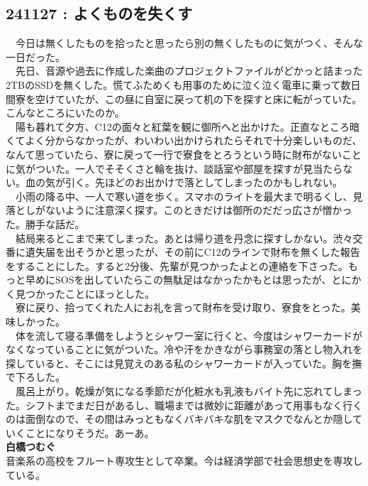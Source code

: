 \begin{myboxnote}
\subsection{241127 : よくものを失くす}
\noindent
　今日は無くしたものを拾ったと思ったら別の無くしたものに気がつく、そんな一日だった。\\
　先日、音源や過去に作成した楽曲のプロジェクトファイルがどかっと詰まった2TBのSSDを無くした。慌てふためくも用事のために泣く泣く電車に乗って数日間寮を空けていたが、この昼に自室に戻って机の下を探すと床に転がっていた。こんなところにいたのか。\\
　陽も暮れて夕方、C12の面々と紅葉を観に御所へと出かけた。正直なところ暗くてよく分からなかったが、わいわい出かけられたらそれで十分楽しいものだ、なんて思っていたら、寮に戻って一行で寮食をとろうという時に財布がないことに気がついた。一人でそそくさと輪を抜け、談話室や部屋を探すが見当たらない。血の気が引く。先ほどのお出かけで落としてしまったのかもしれない。\\
　小雨の降る中、一人で寒い道を歩く。スマホのライトを最大まで明るくし、見落としがないように注意深く探す。このときだけは御所のだだっ広さが憎かった。勝手な話だ。\\
　結局来るとこまで来てしまった。あとは帰り道を丹念に探すしかない。渋々交番に遺失届を出そうかと思ったが、その前にC12のラインで財布を無くした報告をすることにした。すると2分後、先輩が見つかったよとの連絡を下さった。もっと早めにSOSを出していたらこの無駄足はなかったかもとは思ったが、とにかく見つかったことにほっとした。\\
　寮に戻り、拾ってくれた人にお礼を言って財布を受け取り、寮食をとった。美味しかった。\\
　体を流して寝る準備をしようとシャワー室に行くと、今度はシャワーカードがなくなっていることに気がついた。冷や汗をかきながら事務室の落とし物入れを探していると、そこには見覚えのある私のシャワーカードが入っていた。胸を撫で下ろした。\\
　風呂上がり。乾燥が気になる季節だが化粧水も乳液もバイト先に忘れてしまった。シフトまでまだ日があるし、職場までは微妙に距離があって用事もなく行くのは面倒なので、その間はみっともなくバキバキな肌をマスクでなんとか隠していくことになりそうだ。あーあ。\\
 
\vspace{1mm}
\noindent
\textbf{白橋つむぐ}\\
音楽系の高校をフルート専攻生として卒業。今は経済学部で社会思想史を専攻している。

\end{myboxnote}
\vspace{1em}

